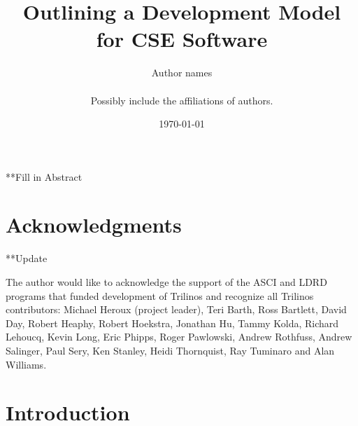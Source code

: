 \documentclass[12pt,relax]{article}
\title{Outlining a Development Model for CSE Software}
\author{
Author names \\
 \\
Possibly include the affiliations of authors.\\
}
\date{\today} %
\begin{document}
\maketitle

**Fill in Abstract


\clearpage

\section*{Acknowledgments}
**Update

The author would like to acknowledge the support of the ASCI and LDRD 
programs that funded development of Trilinos and recognize all Trilinos 
contributors: Michael Heroux (project leader), Teri Barth, Ross Bartlett, 
David Day, Robert Heaphy, Robert Hoekstra, 
Jonathan Hu, Tammy Kolda, Richard Lehoucq, Kevin Long, Eric Phipps, 
Roger Pawlowski, Andrew Rothfuss, Andrew Salinger, Paul Sery, Ken
Stanley, Heidi Thornquist, Ray Tuminaro and Alan Williams.

\clearpage
\tableofcontents
\listoftables

\clearpage
%

\section{Introduction}
\label{Section:Introduction}


                                                                                
                                                                                
                                                                                
                                                                                
\end{document}
